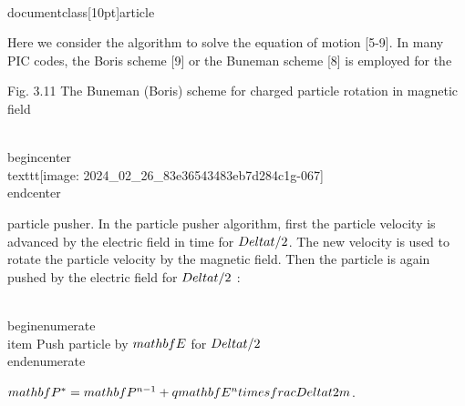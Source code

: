 \\documentclass[10pt]{article}
\begin{document}
Here we consider the algorithm to solve the equation of motion [5-9]. In many PIC codes, the Boris scheme [9] or the Buneman scheme [8] is employed for the

Fig. 3.11 The Buneman (Boris) scheme for charged particle rotation in magnetic field

\\begin{center}
\\texttt{[image: 2024\_02\_26\_83e36543483eb7d284c1g-067]}
\\end{center}

particle pusher. In the particle pusher algorithm, first the particle velocity is advanced by the electric field in time for $\\Delta t / 2$. The new velocity is used to rotate the particle velocity by the magnetic field. Then the particle is again pushed by the electric field for $\\Delta t / 2$ :

\\begin{enumerate}
  \\item Push particle by $\\mathbf{E}$ for $\\Delta t / 2$
\\end{enumerate}

$\\mathbf{P}^{*}=\\mathbf{P}^{n-1}+q \\mathbf{E}^{n} \\times \\frac{\\Delta t}{2 m}$.
\end{document}
